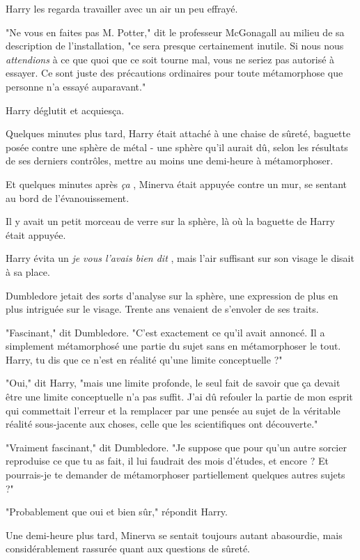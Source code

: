 Harry les regarda travailler avec un air un peu effrayé.

"Ne vous en faites pas M. Potter," dit le professeur McGonagall au milieu de sa description de l'installation, "ce sera presque certainement inutile. Si nous nous \emph{attendions}  à ce que quoi que ce soit tourne mal, vous ne seriez pas autorisé à essayer. Ce sont juste des précautions ordinaires pour toute métamorphose que personne n'a essayé auparavant."

Harry déglutit et acquiesça.

Quelques minutes plus tard, Harry était attaché à une chaise de sûreté, baguette posée contre une sphère de métal - une sphère qu'il aurait dû, selon les résultats de ses derniers contrôles, mettre au moins une demi-heure à métamorphoser.

Et quelques minutes après \emph{ça} , Minerva était appuyée contre un mur, se sentant au bord de l'évanouissement.

Il y avait un petit morceau de verre sur la sphère, là où la baguette de Harry était appuyée.

Harry évita un \emph{je vous l'avais bien dit} , mais l'air suffisant sur son visage le disait à sa place.

Dumbledore jetait des sorts d'analyse sur la sphère, une expression de plus en plus intriguée sur le visage. Trente ans venaient de s'envoler de ses traits.

"Fascinant," dit Dumbledore. "C'est exactement ce qu'il avait annoncé. Il a simplement métamorphosé une partie du sujet sans en métamorphoser le tout. Harry, tu dis que ce n'est en réalité qu'une limite conceptuelle ?"

"Oui," dit Harry, "mais une limite profonde, le seul fait de savoir que ça devait être une limite conceptuelle n'a pas suffit. J'ai dû refouler la partie de mon esprit qui commettait l'erreur et la remplacer par une pensée au sujet de la véritable réalité sous-jacente aux choses, celle que les scientifiques ont découverte."

"Vraiment fascinant," dit Dumbledore. "Je suppose que pour qu'un autre sorcier reproduise ce que tu as fait, il lui faudrait des mois d'études, et encore ? Et pourrais-je te demander de métamorphoser partiellement quelques autres sujets ?"

"Probablement que oui et bien sûr," répondit Harry.

Une demi-heure plus tard, Minerva se sentait toujours autant abasourdie, mais considérablement rassurée quant aux questions de sûreté.

